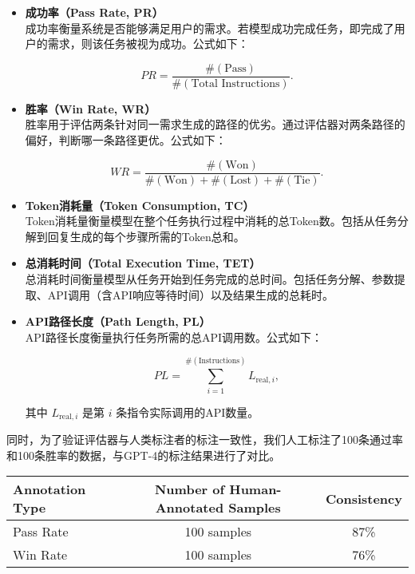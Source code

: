 \begin{itemize}
  \item \textbf{成功率（Pass Rate, PR）} \\
  成功率衡量系统是否能够满足用户的需求。若模型成功完成任务，即完成了用户的需求，则该任务被视为成功。公式如下：

  \begin{equation}
      PR = \frac{\#(\text{Pass})}{\#(\text{Total Instructions})}.
  \end{equation}

  \item \textbf{胜率（Win Rate, WR）} \\
  胜率用于评估两条针对同一需求生成的路径的优劣。通过评估器对两条路径的偏好，判断哪一条路径更优。公式如下：

  \begin{equation}
      WR = \frac{\#(\text{Won})}{\#(\text{Won}) + \#(\text{Lost}) + \#(\text{Tie})}.
  \end{equation}

  \item \textbf{Token消耗量（Token Consumption, TC）} \\
  Token消耗量衡量模型在整个任务执行过程中消耗的总Token数。包括从任务分解到回复生成的每个步骤所需的Token总和。

  \item \textbf{总消耗时间（Total Execution Time, TET）} \\
  总消耗时间衡量模型从任务开始到任务完成的总时间。包括任务分解、参数提取、API调用（含API响应等待时间）以及结果生成的总耗时。

  \item \textbf{API路径长度（Path Length, PL）} \\
  API路径长度衡量执行任务所需的总API调用数。公式如下：

  \begin{equation}
      PL = \sum_{i=1}^{\#(\text{Instructions})} L_{\text{real}, i},
  \end{equation}

  其中 \(L_{\text{real}, i}\) 是第 \(i\) 条指令实际调用的API数量。
\end{itemize}

同时，为了验证评估器与人类标注者的标注一致性，我们人工标注了100条通过率和100条胜率的数据，与GPT-4的标注结果进行了对比。

\begin{table}[h]
  \centering
  \label{tab:consistency}
  \begin{tabular}{l|c|c}
  \toprule
  \textbf{Annotation Type} & \textbf{Number of Human-Annotated Samples} & \textbf{Consistency} \\ \midrule
  Pass Rate                & 100 samples                                & 87\%                 \\
  Win Rate                 & 100 samples                                & 76\%                 \\ 
  \bottomrule
  \end{tabular}
\end{table}
  
